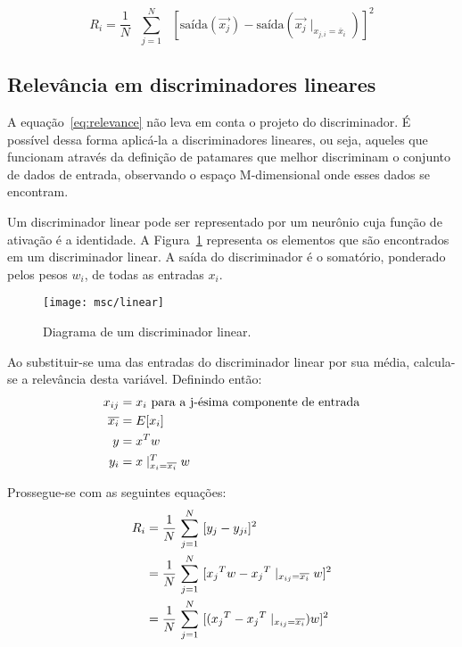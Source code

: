 \begin{equation}
R_i = \frac{1}{N} \text{ } \overset{N}{\underset{j=1}{\sum}} \text{ }
[\text{saída}(\overrightarrow{x_j}) -
\text{saída}(\overrightarrow{x_j}\mid_{x_{j,i} = \overline{x}_i})]^2 
\label{eq:relevance}
\end{equation}

\subsection{Relevância em discriminadores lineares}

A equação~\ref{eq:relevance} não leva em conta o projeto do discriminador. É
possível dessa forma aplicá-la a discriminadores lineares, ou seja, aqueles
que funcionam através da definição de patamares que melhor discriminam o
conjunto de dados de entrada, observando o espaço M-dimensional onde esses
dados se encontram.

Um discriminador linear pode ser representado por um neurônio cuja função de
ativação é a identidade. A Figura~\ref{fig:dlinear} representa os elementos que
são encontrados em um discriminador linear. A saída do discriminador é o
somatório, ponderado pelos pesos $w_i$, de todas as entradas $x_i$.

\begin{figure}
\begin{center}
\texttt{[image: msc/linear]}
\end{center}
\caption{Diagrama de um discriminador linear.}
\label{fig:dlinear}
\end{figure}

Ao substituir-se uma das entradas do discriminador linear por sua média,
calcula-se a relevância desta variável. Definindo então:
\begin{align}
x_{ij} &= x_i \text{ para a j-ésima componente de entrada} \notag \\
\overline{x_i} &= E[x_i] \notag \\
y &= x^Tw \notag \\
y_i &= x\mid_{x_i=\overline{x_i}}^Tw
\end{align}

Prossegue-se com as seguintes equações:
\begin{align}
R_i &= \frac{1}{N} \text{ } \overset{N}{\underset{j=1}{\sum}} \text{ } [y_j -
y_{ji}]^2 \notag \\  
 &= \frac{1}{N} \text{ } \overset{N}{\underset{j=1}{\sum}} \text{ }
[{x_j}^Tw - {x_j}^T\mid_{x_{ij}=\overline{x_{i}}}w]^2 \notag  \\
 & = \frac{1}{N} \text{ } \overset{N}{\underset{j=1}{\sum}} \text{ }
[({x_j}^T - {x_j}^T\mid_{x_{ij}=\overline{x_i}})w]^2 \notag
\end{align}

